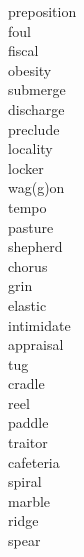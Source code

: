 \documentclass[a4paper, 11pt]{ctexart}
\begin{document}
\begin{multicols*}{3}
\begin{description}
\item[preposition]

\item[foul]

\item[fiscal]

\item[obesity]

\item[submerge]

\item[discharge]

\item[preclude]

\item[locality]

\item[locker]

\item[wag(g)on]

\item[tempo]

\item[pasture]

\item[shepherd]

\item[chorus]

\item[grin]

\item[elastic]

\item[intimidate]

\item[appraisal]

\item[tug]

\item[cradle]

\item[reel]

\item[paddle]

\item[traitor]

\item[cafeteria]

\item[spiral]

\item[marble]

\item[ridge]

\item[spear]


\end{description}
\end{multicols*}
\end{document}
